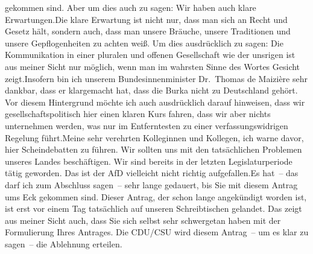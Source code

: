 \documentclass{article}
\begin{document}
gekommen sind. Aber um dies auch zu sagen: Wir haben auch klare Erwartungen.Die klare Erwartung ist nicht nur, dass man sich an Recht und Gesetz hält, sondern auch, dass man unsere Bräuche, unsere Traditionen und unsere Gepflogenheiten zu achten weiß. Um dies ausdrücklich zu sagen: Die Kommunikation in einer pluralen und offenen Gesellschaft wie der unsrigen ist aus meiner Sicht nur möglich, wenn man im wahrsten Sinne des Wortes Gesicht zeigt.Insofern bin ich unserem Bundesinnenminister Dr. Thomas de Maizière sehr dankbar, dass er klargemacht hat, dass die Burka nicht zu Deutschland gehört. Vor diesem Hintergrund möchte ich auch ausdrücklich darauf hinweisen, dass wir gesellschaftspolitisch hier einen klaren Kurs fahren, dass wir aber nichts unternehmen werden, was nur im Entferntesten zu einer verfassungswidrigen Regelung führt.Meine sehr verehrten Kolleginnen und Kollegen, ich warne davor, hier Scheindebatten zu führen. Wir sollten uns mit den tatsächlichen Problemen unseres Landes beschäftigen. Wir sind bereits in der letzten Legislaturperiode tätig geworden. Das ist der AfD vielleicht nicht richtig aufgefallen.Es hat – das darf ich zum Abschluss sagen – sehr lange gedauert, bis Sie mit diesem Antrag ums Eck gekommen sind. Dieser Antrag, der schon lange angekündigt worden ist, ist erst vor einem Tag tatsächlich auf unseren Schreibtischen gelandet. Das zeigt aus meiner Sicht auch, dass Sie sich selbst sehr schwergetan haben mit der Formulierung Ihres Antrages. Die CDU/CSU wird diesem Antrag – um es klar zu sagen – die Ablehnung erteilen.
\end{document}
